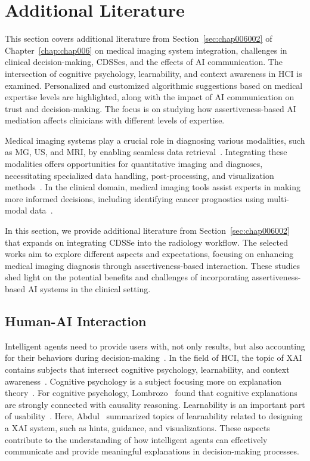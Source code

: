\section{Additional Literature}
\label{sec:app005003}

This section covers additional literature from Section~\ref{sec:chap006002} of Chapter~\ref{chap:chap006} on medical imaging system integration, challenges in clinical decision-making, \acp{CDSSe}, and the effects of \ac{AI} communication. The intersection of cognitive psychology, learnability, and context awareness in \ac{HCI} is examined. Personalized and customized algorithmic suggestions based on medical expertise levels are highlighted, along with the impact of \ac{AI} communication on trust and decision-making. The focus is on studying how assertiveness-based \ac{AI} mediation affects clinicians with different levels of expertise.

Medical imaging systems play a crucial role in diagnosing various modalities, such as \ac{MG}, \ac{US}, and \ac{MRI}, by enabling seamless data retrieval~\cite{faraji2019radiologic}.
Integrating these modalities offers opportunities for quantitative imaging and diagnoses, necessitating specialized data handling, post-processing, and visualization methods~\cite{Igarashi:2016:IVS:2984511.2984537}.
In the clinical domain, medical imaging tools assist experts in making more informed decisions, including identifying cancer prognostics using multi-modal data~\cite{IBRAHIM2019438, Tan2023}.

In this section, we provide additional literature from Section~\ref{sec:chap006002} that expands on integrating \ac{CDSSe} into the radiology workflow.
The selected works aim to explore different aspects and expectations, focusing on enhancing medical imaging diagnosis through assertiveness-based interaction.
These studies shed light on the potential benefits and challenges of incorporating assertiveness-based \ac{AI} systems in the clinical setting.

\subsection{Human-AI Interaction}
\label{sec:app005003001}

Intelligent agents need to provide users with, not only results, but also accounting for their behaviors during decision-making~\cite{10.1145/3313831.3376807}.
In the field of \ac{HCI}, the topic of \ac{XAI} contains subjects that intersect cognitive psychology, learnability, and context awareness~\cite{doi:10.1073/pnas.1618211113, doi:10.1080/07370024.2021.1977128}.
Cognitive psychology is a subject focusing more on explanation theory~\cite{10.1093/mind/fzu023}.
For cognitive psychology, Lombrozo~\cite{LOMBROZO2010303} found that cognitive explanations are strongly connected with causality reasoning.
Learnability is an important part of usability~\cite{10.1145/1753326.1753552}.
Here, Abdul~\cite{10.1145/3173574.3174156} summarized topics of learnability related to designing a \ac{XAI} system, such as hints, guidance, and visualizations.
These aspects contribute to the understanding of how intelligent agents can effectively communicate and provide meaningful explanations in decision-making processes.

